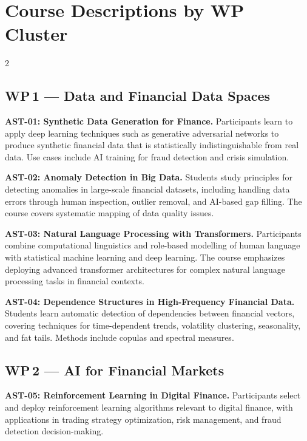 \section{Course Descriptions by WP Cluster}
\label{sec:elective-descriptions}

\begin{multicols}{2}

\subsection*{WP\,1 --- Data and Financial Data Spaces}

\textbf{AST-01: Synthetic Data Generation for Finance.}\quad
Participants learn to apply deep learning techniques such as generative
adversarial networks to produce synthetic financial data that is
statistically indistinguishable from real data.  Use cases include AI
training for fraud detection and crisis simulation.

\textbf{AST-02: Anomaly Detection in Big Data.}\quad
Students study principles for detecting anomalies in large-scale financial
datasets, including handling data errors through human inspection, outlier
removal, and AI-based gap filling.  The course covers systematic mapping of
data quality issues.

\textbf{AST-03: Natural Language Processing with Transformers.}\quad
Participants combine computational linguistics and role-based modelling of
human language with statistical machine learning and deep learning.  The
course emphasizes deploying advanced transformer architectures for complex
natural language processing tasks in financial contexts.

\textbf{AST-04: Dependence Structures in High-Frequency Financial Data.}\quad
Students learn automatic detection of dependencies between financial vectors,
covering techniques for time-dependent trends, volatility clustering,
seasonality, and fat tails.  Methods include copulas and spectral measures.

\subsection*{WP\,2 --- AI for Financial Markets}

\textbf{AST-05: Reinforcement Learning in Digital Finance.}\quad
Participants select and deploy reinforcement learning algorithms relevant to
digital finance, with applications in trading strategy optimization, risk
management, and fraud detection decision-making.


\end{multicols}
